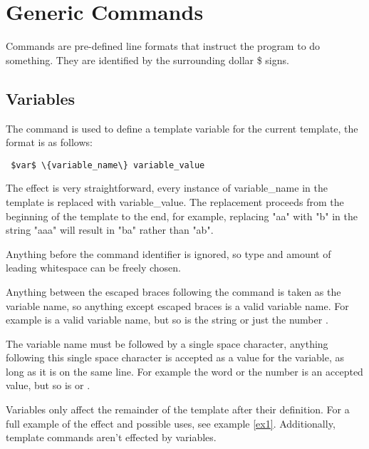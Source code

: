 \documentclass{settings/TU_Delft_Report}
\begin{document}
\newpage
\section{Generic Commands}
Commands are pre-defined line formats that instruct the program to do something. They are identified by the surrounding dollar \$ signs.

\subsection{Variables}
The  command is used to define a template variable for the current template, the format is as follows:
\begin{lstlisting}
 $var$ \{variable_name\} variable_value
\end{lstlisting}

\vsp The effect is very straightforward, every instance of variable\_name in the template is replaced with variable\_value. The replacement proceeds from the beginning of the template to the end, for example, replacing "aa" with "b" in the string "aaa" will result in "ba" rather than "ab".

\vsp Anything before the command identifier is ignored, so type and amount of leading whitespace can be freely chosen.

\vsp Anything between the escaped braces following the  command is taken as the variable name, so anything except escaped braces is a valid variable name. For example  is a valid variable name, but so is the string  or just the number  .

\vsp The variable name must be followed by a single space character, anything following this single space character is accepted as a value for the variable, as long as it is on the same line. For example the word  or the number  is an accepted value, but so is  or .

\vsp Variables only affect the remainder of the template after their definition. For a full example of the effect and possible uses, see example \ref{ex1}. Additionally, template commands aren't effected by variables.
\end{document}
